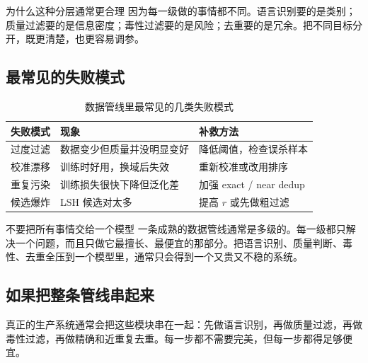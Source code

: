 \begin{importantbox}{为什么这种分层通常更合理}
因为每一级做的事情都不同。语言识别要的是类别；质量过滤要的是信息密度；毒性过滤要的是风险；去重要的是冗余。把不同目标分开，既更清楚，也更容易调参。
\end{importantbox}

\subsection{最常见的失败模式}

\begin{table}[H]
\centering
\small
\renewcommand{\arraystretch}{1.15}
\begin{tabular}{p{3.0cm}p{4.2cm}p{4.0cm}}
\toprule
\textbf{失败模式} & \textbf{现象} & \textbf{补救方法} \\
\midrule
过度过滤 & 数据变少但质量并没明显变好 & 降低阈值，检查误杀样本 \\
校准漂移 & 训练时好用，换域后失效 & 重新校准或改用排序 \\
重复污染 & 训练损失很快下降但泛化差 & 加强 exact / near dedup \\
候选爆炸 & LSH 候选对太多 & 提高 $r$ 或先做粗过滤 \\
\bottomrule
\end{tabular}
\caption{数据管线里最常见的几类失败模式}
\end{table}

\begin{warningbox}{不要把所有事情交给一个模型}
一条成熟的数据管线通常是多级的。每一级都只解决一个问题，而且只做它最擅长、最便宜的那部分。把语言识别、质量判断、毒性、去重全压到一个模型里，通常只会得到一个又贵又不稳的系统。
\end{warningbox}

\subsection{如果把整条管线串起来}

真正的生产系统通常会把这些模块串在一起：先做语言识别，再做质量过滤，再做毒性过滤，再做精确和近重复去重。每一步都不需要完美，但每一步都得足够便宜。

